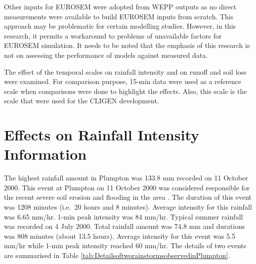 Other inputs for EUROSEM were adopted from WEPP outputs as no direct
measurements were available to build EUROSEM inputs from scratch. This approach
may be problematic for certain modelling studies. However, in this research, it
permits a workaround to problems of unavailable factors for EUROSEM simulation.
It needs to be noted that the emphasis of this research is not on assessing the
performance of models against measured data.

The effect of the temporal scales on rainfall intensity and on runoff and soil
loss were examined. For comparison purpose, 15-min data were used as a reference
scale when comparisons were done to highlight the effects. Also, this scale is
the scale that were used for the CLIGEN development.





\section{Effects on Rainfall Intensity Information}
\label{sec:EffectsOnRainfallIntensityInput}
The highest rainfall amount in Plumpton was 133.8 mm recorded on 11 October
2000. This  event at Plumpton on 11 October 2000 was considered responsible for
the recent severe soil erosion and flooding in the area \citep{boardman2001-346,
marsh2001-343, saunders2001-360}. The duration of this event was 1208 minutes
(i.e.\ 20 hours and 8 minutes). Average intensity for this rainfall was 6.65
mm/hr. 1-min peak intensity was 84 mm/hr. Typical summer rainfall was recorded
on 4 July 2000. Total rainfall amount was 74.8 mm and durations was 808 minutes
(about 13.5 hours). Average intensity for this event was 5.5 mm/hr while 1-min
peak intensity reached 60 mm/hr. The details of two events are summarised in
Table \ref{tab:DetailsoftworainstormsobservedinPlumpton}.

